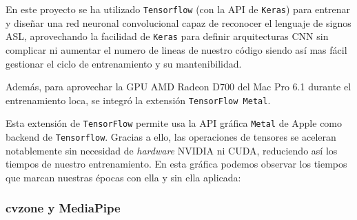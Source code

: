 En este proyecto se ha utilizado \texttt{Tensorflow} (con la API de \texttt{Keras}) para entrenar y diseñar una red neuronal convolucional capaz de reconocer el lenguaje de signos ASL, aprovechando la facilidad de \texttt{Keras} para definir arquitecturas CNN sin complicar ni aumentar el numero de lineas de nuestro código siendo así mas fácil gestionar el ciclo de entrenamiento y su mantenibilidad.

Además, para aprovechar la GPU AMD Radeon D700 del Mac Pro 6.1 durante el entrenamiento loca, se integró la extensión \texttt{TensorFlow Metal}.


Esta extensión de \texttt{TensorFlow} permite usa la API gráfica \texttt{Metal} de Apple como backend de \texttt{Tensorflow}. Gracias a ello, las operaciones de tensores se aceleran notablemente sin necesidad de \textit{hardware} NVIDIA ni CUDA, reduciendo así los tiempos de nuestro entrenamiento. En esta gráfica podemos observar los tiempos que marcan nuestras épocas con ella y sin ella aplicada:

    
\subsubsection{cvzone y MediaPipe}\label{cvzone-mediapie}


